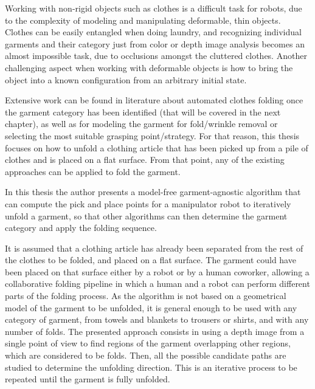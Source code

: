 Working with non-rigid objects such as clothes is a difficult task for robots, due to the complexity of modeling and manipulating deformable, thin objects. Clothes can be easily entangled when doing laundry, and recognizing individual garments and their category just from color or depth image analysis becomes an almost impossible task, due to occlusions amongst the cluttered clothes. Another challenging aspect when working with deformable objects is how to bring the object into a known configuration from an arbitrary initial state.


Extensive work can be found in literature about automated clothes folding once the garment category has been identified (that will be covered in the next chapter), as well as for modeling the garment for fold/wrinkle removal or selecting the most suitable grasping point/strategy. For that reason, this thesis focuses on how to unfold a clothing article that has been picked up from a pile of clothes and is placed on a flat surface. From that point, any of the existing approaches can be applied to fold the garment.

In this thesis the author presents a model-free garment-agnostic algorithm that can compute the pick and place points for a manipulator robot to iteratively unfold a garment, so that other algorithms can then determine the garment category and apply the folding sequence. 

\pagebreak
%
%

It is assumed that a clothing article has already been separated from the rest of the clothes to be folded, and placed on a flat surface. The garment could have been placed on that surface either by a robot or by a human coworker, allowing a collaborative folding pipeline in which a human and a robot can perform different parts of the folding process.
As the algorithm is not based on a geometrical model of the garment to be unfolded, it is general enough to be used with any category of garment, from towels and blankets to trousers or shirts, and with any number of folds. 
%
The presented approach consists in using a depth image from a single point of view to find regions of the garment overlapping other regions, which are considered to be folds. Then, all the possible candidate paths are studied to determine the unfolding direction. This is an iterative process to be repeated until the garment is fully unfolded.

